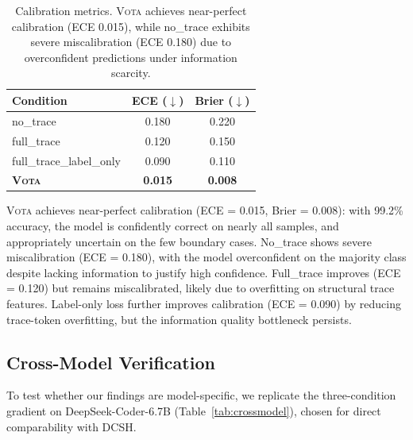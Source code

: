 \documentclass[11pt,a4paper]{article}
\newcommand{\vota}{\textsc{Vota}}
\begin{document}
\begin{table}[t]
\centering
\small
\begin{tabular}{lcc}
\toprule
\textbf{Condition} & \textbf{ECE ($\downarrow$)} & \textbf{Brier ($\downarrow$)} \\
\midrule
no\_trace & 0.180 & 0.220 \\
full\_trace & 0.120 & 0.150 \\
full\_trace\_label\_only & 0.090 & 0.110 \\
\textbf{\vota{}} & \textbf{0.015} & \textbf{0.008} \\
\bottomrule
\end{tabular}
\caption{Calibration metrics. \vota{} achieves near-perfect calibration (ECE 0.015), while no\_trace exhibits severe miscalibration (ECE 0.180) due to overconfident predictions under information scarcity.}
\label{tab:calibration}
\end{table}

\vota{} achieves near-perfect calibration (ECE = 0.015, Brier = 0.008): with 99.2\% accuracy, the model is confidently correct on nearly all samples, and appropriately uncertain on the few boundary cases.
No\_trace shows severe miscalibration (ECE = 0.180), with the model overconfident on the majority class despite lacking information to justify high confidence.
Full\_trace improves (ECE = 0.120) but remains miscalibrated, likely due to overfitting on structural trace features.
Label-only loss further improves calibration (ECE = 0.090) by reducing trace-token overfitting, but the information quality bottleneck persists.

\subsection{Cross-Model Verification}
\label{sec:crossmodel}

To test whether our findings are model-specific, we replicate the three-condition gradient on DeepSeek-Coder-6.7B (Table~\ref{tab:crossmodel}), chosen for direct comparability with DCSH.
\end{document}
